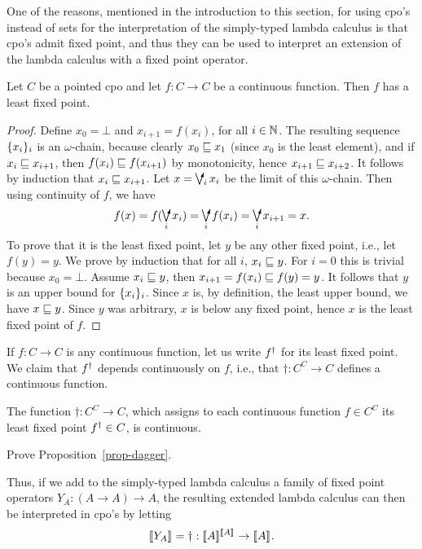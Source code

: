 \documentclass{article}
\begin{document}
One of the reasons, mentioned in the introduction to this section, for
using cpo's instead of sets for the interpretation of the simply-typed
lambda calculus is that cpo's admit fixed point, and thus they can be
used to interpret an extension of the lambda calculus with a fixed point
operator. 

\begin{proposition}
  Let $C$ be a pointed cpo and let $f:C\to C$ be a continuous
  function. Then $f$ has a least fixed point.
\end{proposition}

\begin{proof}
  Define $x_0=\bot$ and $x_{i+1} = f(x_i)$, for all $i\in\mathbb{N}$. The
  resulting sequence $\{x_i\}_i$ is an $\omega$-chain, because clearly
  $x_0\sqsubseteq x_1$ (since $x_0$ is the least element), and if
  $x_{i}\sqsubseteq x_{i+1}$, then $f(x_{i})\sqsubseteq f(x_{i+1})$ by
  monotonicity, hence $x_{i+1}\sqsubseteq x_{i+2}$. It follows by induction
  that $x_{i}\sqsubseteq x_{i+1}$. Let $x=\dirsup_i x_i$ be the limit of
  this $\omega$-chain. Then using continuity of $f$, we have
  \[ f(x) = f(\dirsup_i x_i) = \dirsup_i f(x_i) = \dirsup_i x_{i+1} =
  x.
  \]
  To prove that it is the least fixed point, let $y$ be any other
  fixed point, i.e., let $f(y)=y$. We prove by induction that for all
  $i$, $x_i\sqsubseteq y$. For $i=0$ this is trivial because $x_0=\bot$.
  Assume $x_i\sqsubseteq y$, then $x_{i+1}=f(x_{i})\sqsubseteq f(y)=y$. It
  follows that $y$ is an upper bound for $\{x_i\}_i$. Since $x$ is, by
  definition, the least upper bound, we have $x\sqsubseteq y$. Since $y$
  was arbitrary, $x$ is below any fixed point, hence $x$ is the least
  fixed point of $f$.\eot
\end{proof}

If $f:C\to C$ is any continuous function, let us write $f^{\dagger}$ for
its least fixed point. We claim that $f^{\dagger}$ depends continuously on
$f$, i.e., that $\dagger:C^C\to C$ defines a continuous function. 

\begin{proposition}\label{prop-dagger}
  The function $\dagger:C^C\to C$, which assigns to each continuous
  function $f\in C^C$ its least fixed point $f^{\dagger}\in C$, is
  continuous. 
\end{proposition}

\begin{exercise}
  Prove Proposition~\ref{prop-dagger}.
\end{exercise}

Thus, if we add to the simply-typed lambda calculus a family of
fixed point operators $Y_A:(A\to A)\to A$, the resulting extended lambda
calculus can then be interpreted in cpo's by letting
\[  \semm{Y_A} = \dagger:\semm{A}^{\semm{A}} \to \semm{A}.
\]
\end{document}
